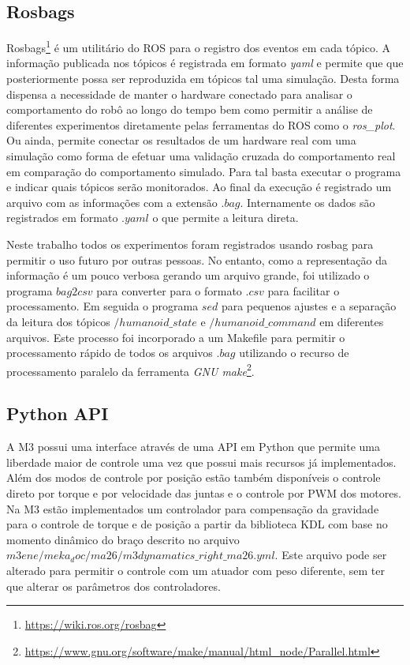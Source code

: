 \subsection{Rosbags}

Rosbags\footnote{\url{https://wiki.ros.org/rosbag}} é um utilitário do ROS para o registro dos eventos em cada tópico. A informação publicada nos tópicos é registrada em formato \textit{yaml} e permite que que posteriormente possa ser reproduzida em tópicos tal uma simulação. Desta forma dispensa a necessidade de manter o hardware conectado para analisar o comportamento do robô ao longo do tempo bem como permitir a análise de diferentes experimentos diretamente pelas ferramentas do ROS como o \textit{ros\_plot}. Ou ainda, permite conectar os resultados de um hardware real com uma simulação como forma de efetuar uma validação cruzada do comportamento real em comparação do comportamento simulado. Para tal basta executar o programa e indicar quais tópicos serão monitorados. Ao final da execução é registrado um arquivo com as informações com a extensão $.bag$. Internamente os dados são registrados em formato $.yaml$ o que permite a leitura direta.

Neste trabalho todos os experimentos foram registrados usando rosbag para permitir o uso futuro por outras pessoas. No entanto, como a representação da informação é um pouco verbosa gerando um arquivo grande, foi utilizado o programa $bag2csv$ para converter para o formato $.csv$ para facilitar o processamento. Em seguida o programa $sed$ para pequenos ajustes e a separação da leitura dos tópicos  $/humanoid\_state$ e $/humanoid\_command$ em diferentes arquivos. Este processo foi incorporado a um Makefile para permitir o processamento rápido de todos os arquivos $.bag$ utilizando o recurso de processamento paralelo da ferramenta \textit{GNU make}\footnote{\url{https://www.gnu.org/software/make/manual/html_node/Parallel.html}}.

\subsection{Python API}

A M3 possui uma interface através de uma API em Python que permite uma liberdade maior de controle uma vez que possui mais recursos já implementados. Além dos modos de controle por posição estão também disponíveis o controle direto por torque e por velocidade das juntas e o controle por PWM dos motores. Na M3 estão implementados um controlador para compensação da gravidade para o controle de torque e de posição a partir da biblioteca KDL com base no momento dinâmico do braço descrito no arquivo $m3ene/meka_doc/ma26/m3dynamatics\_right\_ma26.yml$. Este arquivo pode ser alterado para permitir o controle com um atuador com peso diferente, sem ter que alterar os parâmetros dos controladores.

